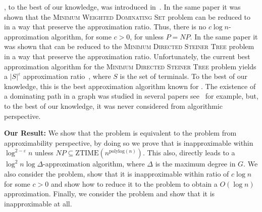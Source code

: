 \Prob{}, to the best of our knowledge, was introduced in~\cite{shin2010approximation}.
In the same paper it was shown that the \textsc{Minimum Weighted Dominating Set} problem 
can be reduced to \Prob{} in a way that preserve the approximation ratio.
Thus, there is no $c\log n$-approximation algorithm, for some $c > 0$, for \Prob{}
unless $P = NP$.
In the same paper it was shown that \Prob{} can be reduced to the 
\textsc{Minimum Directed Steiner Tree} problem in a way that preserve the approximation ratio.
Unfortunately, the current best approximation algorithm for the 
\textsc{Minimum Directed Steiner Tree} problem yields a $|S|^\varepsilon$ 
approximation ratio~\cite{charikar1999approximation},
where $S$ is the set of terminals.
To the best of our knowledge, this is the best approximation algorithm known for \Prob{}.
The existence of a dominating path in a graph was studied in several 
papers see~\cite{broersma1988existence, faudree2017minimum} for example,
but, to the best of our knowledge, it was never considered from algorithmic perspective.

\textbf{Our Result:}
We show that the \Problem{} problem is equivalent to the \ProblemGroup{} problem
from approximability perspective, 
by doing so we prove that \Prob{} is inapproximable within $\log^{2 - \varepsilon} n$   
unless $NP \subseteq \text{ZTIME}(n^{\text{polylog}(n)})$.
This also, directly leads to a $\log^2 n \log \Delta$-approximation algorithm, 
where $\Delta$ is the maximum degree in $G$.
We also consider the \ProblemStar{} problem, show that it is inapproximable within
ratio of $c \log n$ for some $c > 0$ and show how to reduce it to the \ProblemSetCover{}
problem to obtain a $O(\log n)$ approximation.
Finally, we consider the \ProblemPath{} problem and show that it is inapproximable at all.